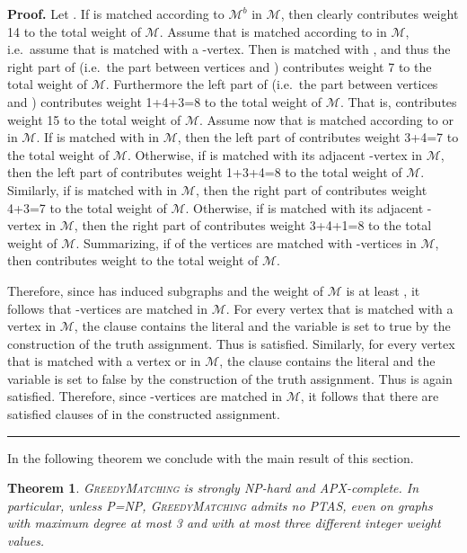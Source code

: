 \documentclass[a4paper,11pt]{article}
\newtheorem{theorem}{Theorem}
\newenvironment{proof}[1][Proof]{\noindent\textbf{#1.} }{\ \rule{0.5em}{0.5em}}
\newcommand{\mcal}{\ensuremath{\mathcal{M}}\xspace}
\newcommand{\mbad}{\ensuremath{\mathcal{M}^b}\xspace}
\newcommand{\greedy}{\textsc{GreedyMatching}\xspace}
\begin{document}
\begin{proof}
Let . If  is matched according to \mbad in \mcal, then 
 clearly contributes weight 14 to the total weight of \mcal. 
Assume that  is matched according to  in \mcal, i.e.~assume 
that  is matched with a -vertex. 
Then  is matched with , and thus the right part of 
 (i.e.~the part between vertices  and ) 
contributes weight 7 to the total weight of \mcal. 
Furthermore the left part of  (i.e.~the part between vertices 
 and ) contributes weight 1+4+3=8 to the total weight
of \mcal. 
That is,  contributes weight 15 to the total weight of \mcal. 
Assume now that  is matched according to  or  in \mcal. 
If  is matched with  in \mcal, then the left part of 
contributes weight 3+4=7 to the total weight of \mcal. 
Otherwise, if  is matched with its adjacent -vertex in \mcal, 
then the left part of  contributes weight 1+3+4=8 to the total 
weight of \mcal. 
Similarly, if  is matched with  in \mcal, then the right 
part of  contributes weight 4+3=7 to the total weight of \mcal. 
Otherwise, if  is matched with its adjacent -vertex in \mcal, 
then the right part of  contributes weight 3+4+1=8 to the total 
weight of \mcal. 
Summarizing, if  of the vertices  are matched with -vertices in \mcal, then 
 contributes weight  to the total weight of \mcal. 



Therefore, since  has  induced subgraphs and the weight of \mcal is at 
least , it follows that  -vertices are matched in \mcal. 
For every vertex  that is matched with a vertex  in \mcal, 
the clause  contains the literal  and the variable  is set to 
true by the construction of the truth assignment. Thus  is satisfied. 
Similarly, for every vertex  that is matched with a vertex 
or  in \mcal, the clause  contains the literal  
and the variable  is set to false by the construction of the truth 
assignment. Thus  is again satisfied. 
Therefore, since  -vertices are matched in \mcal, it follows that
there are  satisfied clauses of  in the constructed assignment.
\end{proof}

\medskip

In the following theorem we conclude with the main result of this section.


\begin{theorem}
\label{thm:inai} \greedy is \emph{strongly NP-hard}
and \emph{APX-complete}. In particular, unless P=NP, \textsc{GreedyMatching}\xspace admits no PTAS, even on graphs with maximum degree at most 3 and with
at most three different integer weight values.
\end{theorem}
\end{document}
